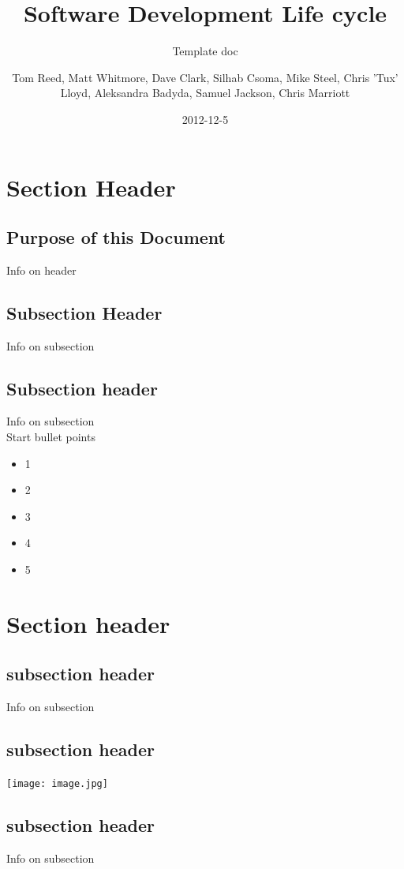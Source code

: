 \documentclass{project}
\begin{document}
\title{Software Development Life cycle}
\subtitle{Template doc}
\author{Tom Reed, Matt Whitmore, Dave Clark, Silhab Csoma, Mike Steel, Chris 'Tux' Lloyd, Aleksandra Badyda, Samuel Jackson, Chris Marriott}
\date{2012-12-5}
\maketitle
\tableofcontents
\newpage
\section{Section Header}
\subsection{Purpose of this Document}
Info on header
\subsection{Subsection Header}
Info on subsection

\subsection{Subsection header}
Info on subsection
\\
Start bullet points
\begin{itemize}
	\item 1
	\item 2
	\item 3
	\item 4
	\item 5
\end{itemize}

\section{Section header}
\subsection{subsection header}
Info on subsection
\subsection{subsection header}
\texttt{[image: image.jpg]}
\subsection{subsection header}
Info on subsection
\end{document}
